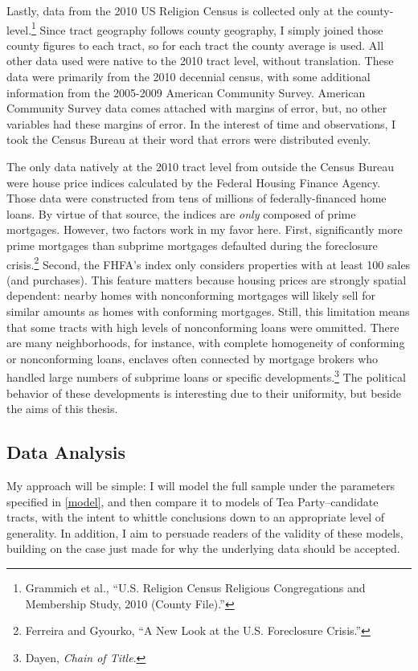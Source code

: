 \documentclass[
]{article}
\begin{document}
Lastly, data from the 2010 US Religion Census is collected only at the county-level.\footnote{Grammich et al., ``U.S. Religion Census Religious Congregations and Membership Study, 2010 (County File).''}
Since tract geography follows county geography, I simply joined those county figures to each tract, so for each tract the county average is used.
All other data used were native to the 2010 tract level, without translation.
These data were primarily from the 2010 decennial census, with some additional information from the 2005-2009 American Community Survey.
American Community Survey data comes attached with margins of error, but, no other variables had these margins of error.
In the interest of time and observations, I took the Census Bureau at their word that errors were distributed evenly.

The only data natively at the 2010 tract level from outside the Census Bureau were house price indices calculated by the Federal Housing Finance Agency.
Those data were constructed from tens of millions of federally-financed home loans.
By virtue of that source, the indices are \emph{only} composed of prime mortgages.
However, two factors work in my favor here.
First, significantly more prime mortgages than subprime mortgages defaulted during the foreclosure crisis.\footnote{Ferreira and Gyourko, ``A New Look at the U.S. Foreclosure Crisis.''}
Second, the FHFA's index only considers properties with at least 100 sales (and purchases).
This feature matters because housing prices are strongly spatial dependent: nearby homes with nonconforming mortgages will likely sell for similar amounts as homes with conforming mortgages.
Still, this limitation means that some tracts with high levels of nonconforming loans were ommitted.
There are many neighborhoods, for instance, with complete homogeneity of conforming or nonconforming loans, enclaves
often connected by mortgage brokers who handled large numbers of subprime loans or specific developments.\footnote{Dayen, \emph{Chain of Title}.}
The political behavior of these developments is interesting due to their uniformity, but beside the aims of this thesis.

\hypertarget{analysis}{%
\subsection{Data Analysis}\label{analysis}}

My approach will be simple: I will model the full sample under the parameters specified in \ref{model}, and then compare it to models of Tea Party--candidate tracts, with the intent to whittle conclusions down to an appropriate level of generality.
In addition, I aim to persuade readers of the validity of these models, building on the case just made for why the underlying data should be accepted.
\end{document}
